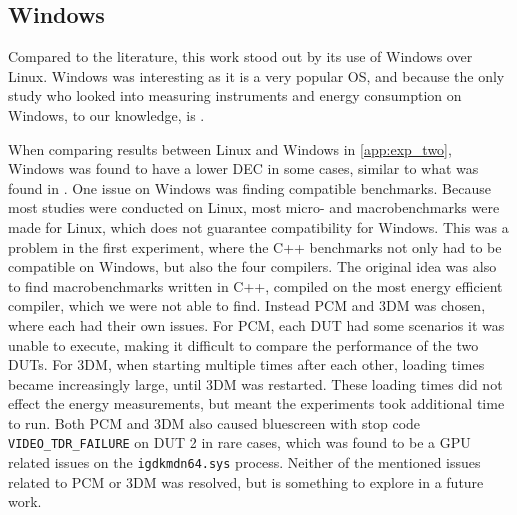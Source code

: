 \subsection{Windows}

Compared to the literature, this work stood out by its use of Windows over Linux\cite{khan2018rapl, georgiou2020energy, pereira2017}. Windows was interesting as it is a very popular OS, and because the only study who looked into measuring instruments and energy consumption on Windows, to our knowledge, is \cite{biksbois}.

When comparing results between Linux and Windows in \cref{app:exp_two}, Windows was found to have a lower DEC in some cases, similar to what was found in \cite{biksbois}. One issue on Windows was finding compatible benchmarks. Because most studies were conducted on Linux, most micro- and macrobenchmarks were made for Linux, which does not guarantee compatibility for Windows. This was a problem in the first experiment, where the C++ benchmarks not only had to be compatible on Windows, but also the four compilers. The original idea was also to find macrobenchmarks written in C++, compiled on the most energy efficient compiler, which we were not able to find. Instead PCM and 3DM was chosen, where each had their own issues. For PCM, each DUT had some scenarios it was unable to execute, making it difficult to compare the performance of the two DUTs. For 3DM, when starting multiple times after each other, loading times became increasingly large, until 3DM was restarted. These loading times did not effect the energy measurements, but meant the experiments took additional time to run. Both PCM and 3DM also caused bluescreen with stop code \texttt{VIDEO\_TDR\_FAILURE} on DUT 2 in rare cases, which was found to be a GPU related issues on the \texttt{igdkmdn64.sys} process. Neither of the mentioned issues related to PCM or 3DM was resolved, but is something to explore in a future work.




